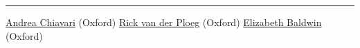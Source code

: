 \documentclass[letterpaper, 11pt]{article}
\begin{document}
\section*{\color{OxfordBlue}{References}}

\vspace{-0.6cm}
\noindent\rule{\textwidth}{0.4pt}

\vspace{0.1cm}

\noindent
\href{https://sites.google.com/view/andreachiavari/home}{Andrea Chiavari} (Oxford) \hspace{0.35cm}  \href{https://rickvanderploeg.wordpress.com/}{Rick van der Ploeg} (Oxford) \hspace{0.35cm} \href{https://elizabeth-baldwin.me.uk/}{Elizabeth Baldwin} (Oxford)
\end{document}
